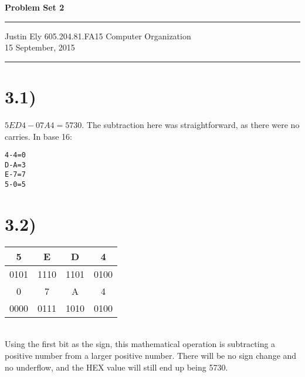 \documentclass[a4paper,11pt]{article}
\begin{document}
\begin{flushright}

\vspace{1.1cm}

{\bf\Huge Problem Set 2}

\rule{0.25\linewidth}{0.5pt}

\vspace{0.5cm}
Justin Ely
\linebreak
\newline
\footnotesize{605.204.81.FA15 Computer Organization\\}
\vspace{0.5cm}
15 September, 2015
\end{flushright}

\noindent\rule{\linewidth}{1.0pt}



\section*{3.1)}
$5ED4 - 07A4 = 5730$.  The subtraction here was straightforward, as there were no carries.  In base 16:
\begin{verbatim}
4-4=0
D-A=3
E-7=7
5-0=5
\end{verbatim}


\section*{3.2)} 

\begin{tabular}{| c | c | c | c | }
  \hline			
  5 & E & D & 4  \\
  \hline
  0101 & 1110 & 1101 & 0100  \\
  \hline  
   \hline			
  0 & 7 & A & 4  \\
  \hline
  0000 & 0111 & 1010 & 0100  \\
  \hline  
\end{tabular} \\

Using the first bit as the sign, this mathematical operation is subtracting a positive number from a larger positive number.  There will be no sign change and no underflow, and the HEX value will still end up being 5730.

\end{document}
